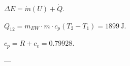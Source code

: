 \( \Delta E = \dot{m}(U) + \dot{Q} \).  

\( Q_{12} = m_{EW} \cdot m \cdot c_p(T_2 - T_1) = 1899 \, \text{J} \).  

\( c_p = R + c_v = 0.79928 \).  

---